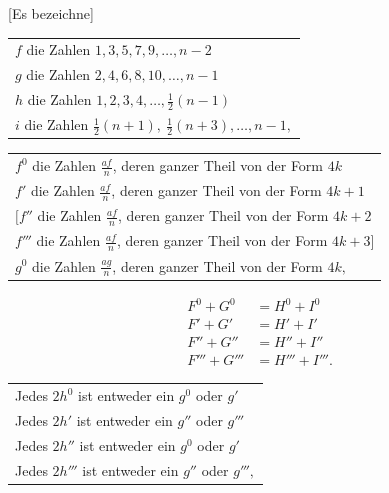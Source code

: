 [Es bezeichne]
\begin{center}\begin{tabular}{@{}l@{}}
\(f\) die Zahlen \(1,3,5,7,9,\ldots,n-2\)\\
\(g\) die Zahlen \(2,4,6,8,10,\ldots,n-1\)\\
\(h\) die Zahlen \(1,2,3,4,\ldots,\frac12(n-1)\)\\
\(i\) die Zahlen \(\frac12(n+1),\ \frac12(n+3),\ldots,n-1,\)
\end{tabular}\end{center}
\begin{center}\begin{tabular}{@{}l@{}}
\(f^0\) die Zahlen \(\frac{af}n\), deren ganzer Theil von der Form \(4k\)\\[3pt]
\(f'\) die Zahlen \(\frac{af}n\), deren ganzer Theil von der Form \(4k+1\)\\[3pt]
\([f''\) die Zahlen \(\frac{af}n\), deren ganzer Theil von der Form \(4k+2\)\\[3pt]
\(f'''\) die Zahlen \(\frac{af}n\), deren ganzer Theil von der Form \(4k+3]\)\\[3pt]
\(g^0\) die Zahlen \(\frac{ag}n\), deren ganzer Theil von der Form \(4k,\)
\end{tabular}\end{center}
\[
\begin{aligned}
F^0+G^0&=H^0+I^0\\
F'+G'&=H'+I'\\
F''+G''&=H''+I''\\
F'''+G'''&=H'''+I'''.
\end{aligned}
\]
\begin{center}\begin{tabular}{@{}l@{}}
Jedes \(2h^0\) ist entweder ein \(g^0\) oder \(g'\)\\
Jedes \(2h'\) ist entweder ein \(g''\) oder \(g'''\)\\
Jedes \(2h''\) ist entweder ein \(g^0\) oder \(g'\)\\
Jedes \(2h'''\) ist entweder ein \(g''\) oder \(g''',\)
\end{tabular}\end{center}
